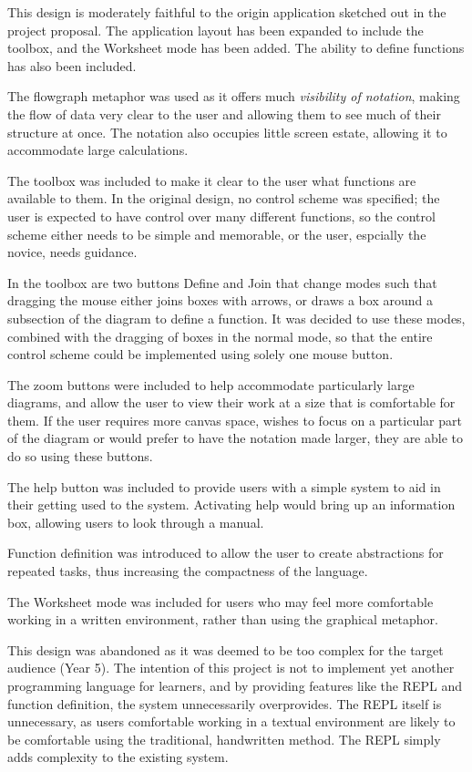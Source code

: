 \documentclass[12pt,twoside,notitlepage,xetex]{report}
\begin{document}
This design is moderately faithful to the origin application sketched out in the project proposal.  The application layout has been expanded to include the toolbox, and the {\sfapp Worksheet} mode has been added.  The ability to define functions has also been included.

The flowgraph metaphor was used as it offers much \emph{visibility of notation}, making the flow of data very clear to the user and allowing them to see much of their structure at once.  The notation also occupies little screen estate, allowing it to accommodate large calculations.

The toolbox was included to make it clear to the user what functions are available to them.  In the original design, no control scheme was specified; the user is expected to have control over many different functions, so the control scheme either needs to be simple and memorable, or the user, espcially the novice, needs guidance.

In the toolbox are two buttons {\sfapp Define} and {\sfapp Join} that change modes such that dragging the mouse either joins boxes with arrows, or draws a box around a subsection of the diagram to define a function.  It was decided to use these modes, combined with the dragging of boxes in the normal mode, so that the entire control scheme could be implemented using solely one mouse button.

The zoom buttons were included to help accommodate particularly large diagrams, and allow the user to view their work at a size that is comfortable for them.  If the user requires more canvas space, wishes to focus on a particular part of the diagram or would prefer to have the notation made larger, they are able to do so using these buttons.

The help button was included to provide users with a simple system to aid in their getting used to the system.  Activating help would bring up an information box, allowing users to look through a manual.

Function definition was introduced to allow the user to create abstractions for repeated tasks, thus increasing the compactness of the language.

The {\sfapp Worksheet} mode was included for users who may feel more comfortable working in a written environment, rather than using the graphical metaphor.

This design was abandoned as it was deemed to be too complex for the target audience (Year 5).  The intention of this project is not to implement yet another programming language for learners, and by providing features like the REPL and function definition, the system unnecessarily overprovides.  The REPL itself is unnecessary, as users comfortable working in a textual environment are likely to be comfortable using the traditional, handwritten method. The REPL simply adds complexity to the existing system.
\end{document}
